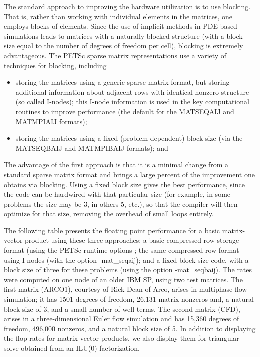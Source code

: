\documentclass[twoside,12pt]{../sty/report_petsc}
\begin{document}
The standard approach to improving the hardware utilization is to use
blocking. That is, rather than working with individual elements in
the matrices, one employs blocks of elements.  Since the use of
implicit methods in PDE-based simulations leads to matrices with a
naturally blocked structure (with a block size equal to the number of
degrees of freedom per cell), blocking is extremely advantageous.  The
PETSc sparse matrix representations use a variety
of techniques for blocking, including

\begin{itemize}
\item storing the matrices using a generic sparse matrix format, but 
   storing additional information about adjacent rows with identical 
   nonzero structure (so called I-nodes); this I-node information is 
   used in the key computational routines to improve performance
   (the default for the MATSEQAIJ and MATMPIAIJ formats);
\item storing the matrices using a fixed (problem dependent) block size
   (via the MATSEQBAIJ and MATMPIBAIJ formats); and
\end{itemize}

The advantage of the first approach is that it is a minimal change
from a standard sparse matrix format and brings a large percent of the
improvement one obtains via blocking.  Using a fixed block size gives
the best performance, since the code can be hardwired with that
particular size (for example, in some problems the size may be 3, in
others 5, etc.), so that the compiler will then optimize for that
size, removing the overhead of small loops entirely.

The following table presents the floating point performance
for a basic matrix-vector product using these three approaches: a basic
compressed row storage format (using the PETSc runtime options 
; the same compressed row format using
I-nodes (with the option {-mat\_seqaij}); and a fixed block size code,
with a block size of three for these problems (using the option 
{-mat\_seqbaij}). The rates were computed on one
node of an older IBM SP, using two test matrices.  The first matrix
(ARCO1), courtesy of Rick Dean of Arco, arises in multiphase flow
simulation; it has 1501 degrees of freedom, 26,131 matrix nonzeros
and, a natural block size of 3, and a small number of well terms. The
second matrix (CFD), arises in a three-dimensional Euler flow
simulation and has 15,360 degrees of freedom, 496,000 nonzeros, and a
natural block size of 5. In addition to displaying the flop rates for
matrix-vector products, we also display them for triangular solve
obtained from an ILU(0) factorization.
\end{document}
